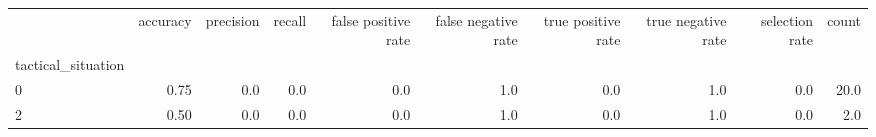 \begin{tabular}{lrrrrrrrrr}
\toprule
{} &  accuracy &  precision &  recall &  false positive rate &  false negative rate &  true positive rate &  true negative rate &  selection rate &  count \\
tactical\_situation &           &            &         &                      &                      &                     &                     &                 &        \\
\midrule
0                  &      0.75 &        0.0 &     0.0 &                  0.0 &                  1.0 &                 0.0 &                 1.0 &             0.0 &   20.0 \\
2                  &      0.50 &        0.0 &     0.0 &                  0.0 &                  1.0 &                 0.0 &                 1.0 &             0.0 &    2.0 \\
\bottomrule
\end{tabular}
